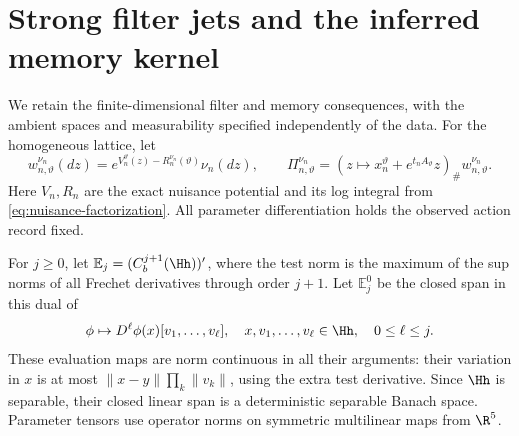 \section{Strong filter jets and the inferred memory kernel}
\label{sec:filter-memory}
We retain the finite-dimensional filter and memory consequences, with the
ambient spaces and measurability specified independently of the data.
For the homogeneous lattice, let
\[
 w_{n,\vartheta}^{\nu_n}(dz)=e^{V_n^\vartheta(z)-R_n^{\nu_n}(\vartheta)}\nu_n(dz),
 \qquad
 \Pi_{n,\vartheta}^{\nu_n}
 =(z\mapsto x_n^\vartheta+e^{t_nA_\vartheta}z)_\#w_{n,\vartheta}^{\nu_n}.
\]
Here \(V_n,R_n\) are the exact nuisance potential and its log integral
from \eqref{eq:nuisance-factorization}. All parameter differentiation
holds the observed action record fixed.

For \(j\ge0\), let \(\mathbb E_j=(C_b^{j+1}(\Hh))'\), where the test
norm is the maximum of the sup norms of all Frechet derivatives through
order \(j+1\). Let \(\mathbb E_j^0\) be the closed span in this dual of
\[
 \phi\mapsto D^\ell\phi(x)[v_1,\ldots,v_\ell],
 \quad x,v_1,\ldots,v_\ell\in\Hh,\quad0\le\ell\le j.
\]
These evaluation maps are norm continuous in all their arguments: their
variation in \(x\) is at most \(\|x-y\|\prod_k\|v_k\|\), using the
extra test derivative. Since \(\Hh\) is separable, their closed linear
span is a deterministic separable Banach space. Parameter tensors use
operator norms on symmetric multilinear maps from \(\R^5\).

